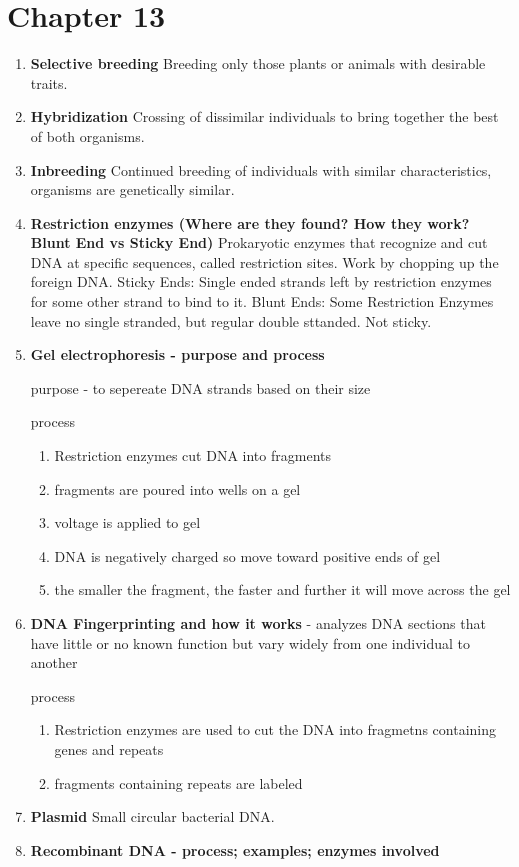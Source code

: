 \documentclass[9pt]{article}
\begin{document}
\section*{Chapter 13}
\begin{enumerate}
  \item {\bf Selective breeding} Breeding only those plants or animals
    with desirable traits.
  \item {\bf Hybridization} Crossing of dissimilar individuals to
    bring together the best of both organisms.
  \item {\bf Inbreeding} Continued breeding of individuals with
    similar characteristics, organisms are genetically similar.
  \item {\bf Restriction enzymes (Where are they found? How they work?
    Blunt End vs Sticky End)} Prokaryotic enzymes that recognize and
    cut DNA at specific sequences, called restriction sites. Work by
    chopping up the foreign DNA. Sticky Ends: Single ended strands
    left by restriction enzymes for some other strand to bind to
    it. Blunt Ends: Some Restriction Enzymes leave no single stranded,
    but regular double sttanded. Not sticky.
  \item {\bf Gel electrophoresis  -  purpose and process}

  purpose - to sepereate DNA strands based on their size
  
  process
  \begin{enumerate}
    \item Restriction enzymes cut DNA into fragments
    \item fragments are poured into wells on a gel
    \item voltage is applied to gel
    \item DNA is negatively charged so move toward positive ends of gel
    \item the smaller the fragment, the faster and further it will move across the gel
  \end{enumerate}
  \item {\bf DNA Fingerprinting and how it works} - analyzes DNA sections that have little or no known function but vary widely from one individual to another
  
  process
  \begin{enumerate}
    \item Restriction enzymes are used to cut the DNA into fragmetns containing genes and repeats
    \item fragments containing repeats are labeled
  \end{enumerate}
  \item {\bf Plasmid} Small circular bacterial DNA.
  \item {\bf Recombinant DNA  -  process; examples; enzymes involved}


\end{enumerate}
\end{document}
